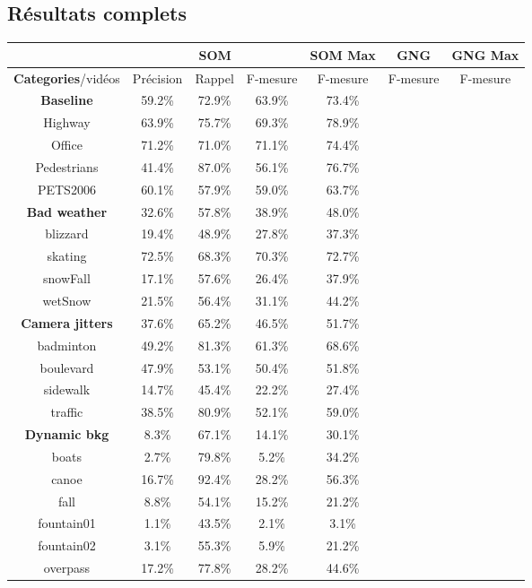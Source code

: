 	\subsection{Résultats complets}\label{sec:res:stats}

	\begin{tableth}
    \begin{tabular}{|c|c|c|c|c|c|c|}
		\hline
		& \multicolumn{3}{c|}{SOM} & SOM Max & GNG & GNG Max\\
        \hline
        \textbf{Categories}/vidéos & Précision & Rappel & F-mesure & F-mesure & F-mesure & F-mesure\\
        \hline
        \textbf{Baseline} & 59.2\% & 72.9\% & 63.9\% & 73.4\% & &\\
		\hline
		Highway & 63.9\% & 75.7\% & 69.3\% & 78.9\% & &\\
		Office & 71.2\% & 71.0\% & 71.1\% & 74.4\% & &\\
		Pedestrians & 41.4\% & 87.0\% & 56.1\% & 76.7\% & &\\
		PETS2006 & 60.1\% & 57.9\% & 59.0\% & 63.7\% & &\\
		\hline
        \textbf{Bad weather} & 32.6\% & 57.8\% & 38.9\% & 48.0\% & &\\
		\hline
blizzard & 19.4\% & 48.9\% & 27.8\% & 37.3\% & &\\
skating & 72.5\% & 68.3\% & 70.3\% & 72.7\% & &\\
snowFall & 17.1\% & 57.6\% & 26.4\% & 37.9\% & &\\
wetSnow & 21.5\% & 56.4\% & 31.1\% & 44.2\% & &\\
		\hline
        \textbf{Camera jitters} & 37.6\% & 65.2\% & 46.5\% & 51.7\% & &\\
		\hline
badminton & 49.2\% & 81.3\% & 61.3\% & 68.6\% & &\\
boulevard & 47.9\% & 53.1\% & 50.4\% & 51.8\% & &\\
sidewalk & 14.7\% & 45.4\% & 22.2\% & 27.4\% & &\\
traffic & 38.5\% & 80.9\% & 52.1\% & 59.0\% & &\\

		\hline
        \textbf{Dynamic bkg} & 8.3\% & 67.1\% & 14.1\% & 30.1\% & &\\
		\hline
boats & 2.7\% & 79.8\% & 5.2\% & 34.2\% & &\\
canoe & 16.7\% & 92.4\% & 28.2\% & 56.3\% & &\\
fall & 8.8\% & 54.1\% & 15.2\% & 21.2\% & &\\
fountain01 & 1.1\% & 43.5\% & 2.1\% & 3.1\% & &\\
fountain02 & 3.1\% & 55.3\% & 5.9\% & 21.2\% & &\\
overpass & 17.2\% & 77.8\% & 28.2\% & 44.6\% & &\\


\end{tabular}
\end{tableth}
